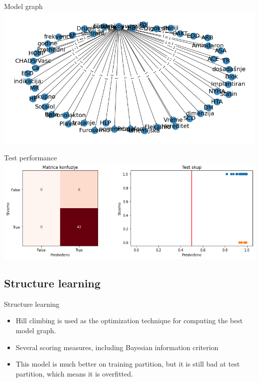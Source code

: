 \documentclass[hyperref={bookmarks=false}]{beamer}
\begin{document}
\begin{frame}{Model graph}
\includegraphics[width=\textwidth]{../slike/naive1.png}
\end{frame}

\begin{frame}{Test performance}
\includegraphics[width=\textwidth]{../slike/naive2.png}
\end{frame}

\subsection{Structure learning}
\begin{frame}{Structure learning}
\begin{itemize}
    \item Hill climbing is used as the optimization technique for computing the best model graph.
    \item Several scoring measures, including Bayesian information criterion
    \item This model is much better on training partition, but it is still bad at test partition, which means it is overfitted.
\end{itemize}
\end{frame}
\end{document}
